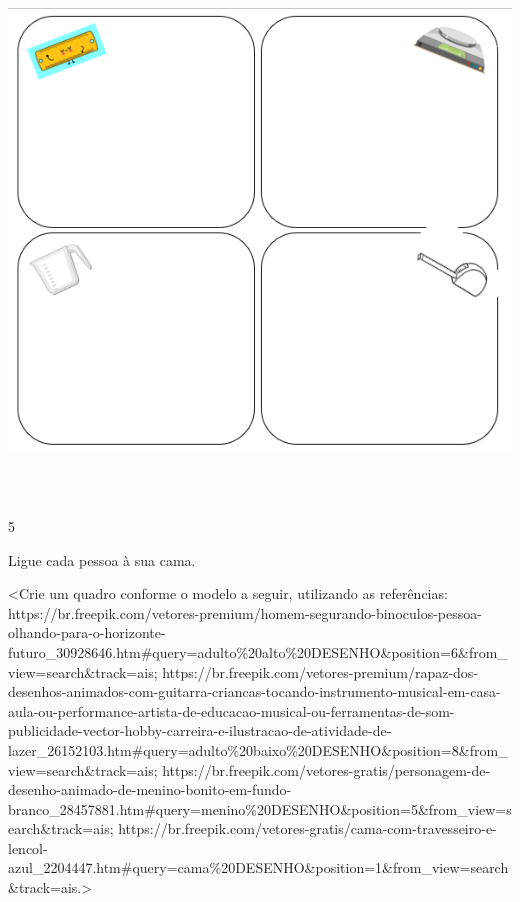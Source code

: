 {\includegraphics[width=6.43650in,height=5.62891in]{media/image26.png}

\num{5}

Ligue cada pessoa à sua cama.

\textless{}Crie um quadro conforme o modelo a seguir, utilizando as
referências:
https://br.freepik.com/vetores-premium/homem-segurando-binoculos-pessoa-olhando-para-o-horizonte-futuro\_30928646.htm\#query=adulto\%20alto\%20DESENHO\&position=6\&from\_view=search\&track=ais;
https://br.freepik.com/vetores-premium/rapaz-dos-desenhos-animados-com-guitarra-criancas-tocando-instrumento-musical-em-casa-aula-ou-performance-artista-de-educacao-musical-ou-ferramentas-de-som-publicidade-vector-hobby-carreira-e-ilustracao-de-atividade-de-lazer\_26152103.htm\#query=adulto\%20baixo\%20DESENHO\&position=8\&from\_view=search\&track=ais;
https://br.freepik.com/vetores-gratis/personagem-de-desenho-animado-de-menino-bonito-em-fundo-branco\_28457881.htm\#query=menino\%20DESENHO\&position=5\&from\_view=search\&track=ais;
https://br.freepik.com/vetores-gratis/cama-com-travesseiro-e-lencol-azul\_2204447.htm\#query=cama\%20DESENHO\&position=1\&from\_view=search\&track=ais.\textgreater{}

}

